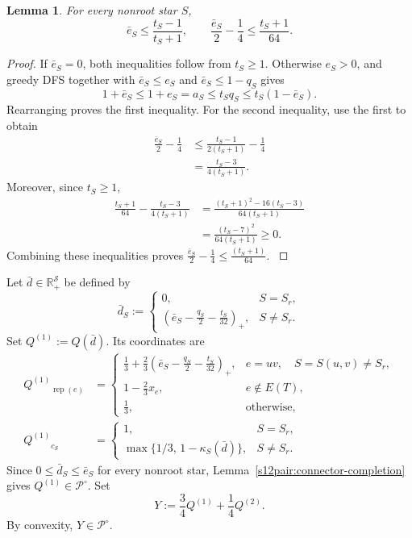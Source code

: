 \documentclass[11pt]{amsart}
\DeclareMathOperator{\R}{\mathbb{R}}
\newcommand{\rep}[1]{\operatorname{rep}(#1)}
\def\R{{\mathbb R}}
\newcommand{\1}{\mathbbm{1}}
\newtheorem{lemma}[theorem]{Lemma}
\begin{document}
\begin{lemma}\label{s11p:scalar}
{For every nonroot star $S$,
\[
 \bar e_S\le\frac{t_S-1}{t_S+1},
 \qquad
 \frac{\bar e_S}{2}-\frac14\le\frac{t_S+1}{64}.
\]}
\end{lemma}
\begin{proof}
{If $\bar e_S=0$, both inequalities follow from
$t_S\ge1$. Otherwise $e_S>0$, and greedy DFS together with
$\bar e_S\le e_S$ and $\bar e_S\le1-q_S$ gives
\[
 1+\bar e_S\le1+e_S=a_S
 \le t_Sq_S\le t_S(1-\bar e_S).
\]
Rearranging proves the first inequality. For the second inequality, use the first to obtain
\[
 \begin{aligned}
 \frac{\bar e_S}{2}-\frac14
 &\le\frac{t_S-1}{2(t_S+1)}-\frac14\\
 &=\frac{t_S-3}{4(t_S+1)}.
 \end{aligned}
\]
Moreover, since $t_S\ge1$,
\[
 \begin{aligned}
 \frac{t_S+1}{64}-\frac{t_S-3}{4(t_S+1)}
 &=\frac{(t_S+1)^2-16(t_S-3)}{64(t_S+1)}\\
 &=\frac{(t_S-7)^2}{64(t_S+1)}
 \ge0.
 \end{aligned}
\]
Combining these inequalities proves
$\frac {\bar e_S}{2}-\frac14\le\frac{(t_S+1)}{64}$.
}
\end{proof}

Let $\bar d\in\R_+^{\mathcal S}$ be defined by
\[
 \bar d_S:=
 \begin{cases}
 0,&S=S_r,\\[4pt]
 \displaystyle\left(\bar e_S-\frac{q_S}{2}
                              -\frac{t_S}{32}\right)_+,
                                       &S\ne S_r.
 \end{cases}
\]
{
Set $Q^{(1)}:=Q(\bar d)$. Its coordinates are
}
\[
 \begin{aligned}
 {Q^{(1)}}_{\rep{e}}
 &=
 \begin{cases}
 \displaystyle\frac13+\frac23
       \left(\bar e_S-\frac{q_S}{2}-\frac{t_S}{32}\right)_+,
          &e=uv,\quad S=S(u,v)\ne S_r,\\[6pt]
 \displaystyle1-\frac23x_e,&e\notin E(T),\\[4pt]
 \displaystyle\frac13,&\text{otherwise},
 \end{cases}\\[7pt]
 {Q^{(1)}}_{c_S}
 &=
 \begin{cases}
 1,&S=S_r,\\[3pt]
 \max\{1/3,\,1-\kappa_S(\bar d)\},&S\ne S_r.
 \end{cases}
 \end{aligned}
\]
Since $0\le \bar d_S\le\bar e_S$ for every nonroot star,
Lemma~\ref{s12pair:connector-completion}
gives ${Q^{(1)}}\in{\mathcal P^\circ}$. Set
\[
 Y:=\frac34{Q^{(1)}}+\frac14{Q^{(2)}}.
\]
By convexity, $Y\in{\mathcal P^\circ}$.
\end{document}
